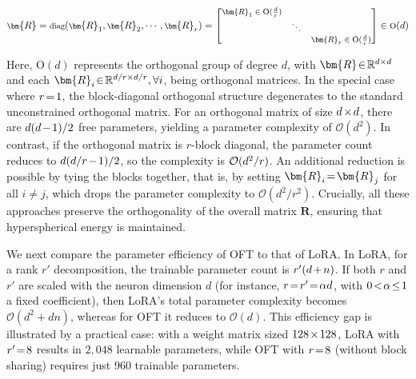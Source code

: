 \begin{equation}
    \footnotesize
    \bm{R}=\text{diag}(\bm{R}_1,\bm{R}_2,\cdots,\bm{R}_r)=\begin{bmatrix}
    \bm{R}_1\in \text{O}(\frac{d}{r}) &  &\\
    &\ddots & \\
    & & \bm{R}_r\in \text{O}(\frac{d}{r})
    \end{bmatrix}\in \text{O}(d)
\end{equation}

Here, $\text{O}(d)$ represents the orthogonal group of degree $d$, with $\thickmuskip=2mu \medmuskip=2mu \bm{R}\in\mathbb{R}^{d\times d}$ and each $\thickmuskip=2mu \medmuskip=2mu \bm{R}_i\in\mathbb{R}^{d/r\times d/r},\forall i$, being orthogonal matrices. In the special case where $\thickmuskip=2mu \medmuskip=2mu r=1$, the block-diagonal orthogonal structure degenerates to the standard unconstrained orthogonal matrix. For an orthogonal matrix of size $\thickmuskip=2mu \medmuskip=2mu d\times d$, there are $\thickmuskip=2mu \medmuskip=2mu d(d-1)/2$ free parameters, yielding a parameter complexity of $\mathcal{O}(d^2)$. In contrast, if the orthogonal matrix is $r$-block diagonal, the parameter count reduces to $\thickmuskip=2mu \medmuskip=2mu d(d/r-1)/2$, so the complexity is $\thickmuskip=2mu \medmuskip=2mu \mathcal{O}(d^2/r)$. An additional reduction is possible by tying the blocks together, that is, by setting $\thickmuskip=2mu \medmuskip=2mu\bm{R}_i=\bm{R}_j$ for all $i\neq j$, which drops the parameter complexity to $\mathcal{O}(d^2/r^2)$. Crucially, all these approaches preserve the orthogonality of the overall matrix $\bm{R}$, ensuring that hyperspherical energy is maintained.

We next compare the parameter efficiency of OFT to that of LoRA. In LoRA, for a rank $r'$ decomposition, the trainable parameter count is $\thickmuskip=2mu \medmuskip=2mu r'(d+n)$. If both $r$ and $r'$ are scaled with the neuron dimension $d$ (for instance, $\thickmuskip=2mu \medmuskip=2mu r=r'=\alpha d$, with $\thickmuskip=2mu \medmuskip=2mu 0<\alpha\leq 1$ a fixed coefficient), then LoRA's total parameter complexity becomes $\mathcal{O}(d^2+dn)$, whereas for OFT it reduces to $\mathcal{O}(d)$. This efficiency gap is illustrated by a practical case: with a weight matrix sized $\thickmuskip=2mu \medmuskip=2mu 128\times 128$, LoRA with $\thickmuskip=2mu \medmuskip=2mu r'=8$ results in $2,048$ learnable parameters, while OFT with $\thickmuskip=2mu \medmuskip=2mu r=8$ (without block sharing) requires just $960$ trainable parameters.

